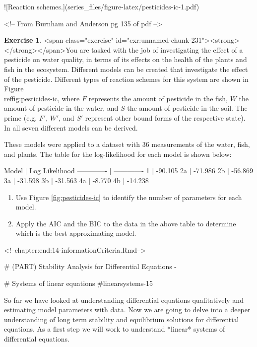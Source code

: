\documentclass[
]{book}
\theoremstyle{definition}
\theoremstyle{definition}
\theoremstyle{definition}
\newtheorem{exercise}{Exercise}[chapter]
\theoremstyle{remark}
\begin{document}
![\label{fig:pesticides-ic}Reaction schemes.](series_files/figure-latex/pesticides-ic-1.pdf) 



<!-- From Burnham and Anderson pg 135 of pdf -->
\begin{exercise}
<span class="exercise" id="exr:unnamed-chunk-231"><strong>\label{exr:unnamed-chunk-231} </strong></span>You are tasked with the job of investigating the effect of a pesticide on water quality, in terms of its effects on the health of the plants and fish in the ecosystem.  Different models can be created that investigate the effect of the pesticide.  Different types of reaction schemes for this system are shown in Figure \\ref{fig:pesticides-ic}, where $F$ represents the amount of pesticide in the fish, $W$ the amount of pesticide in the water, and $S$ the amount of pesticide in the soil.  The prime (e.g. $F'$, $W'$, and $S'$ represent other bound forms of the respective state).  In all seven different models can be derived.

These models were applied to a dataset with 36 measurements of the water, fish, and plants. The table for the log-likelihood for each model is shown below:

Model  | Log Likelihood 
------------- | ------------- 
1    | -90.105  
2a    | -71.986 
2b       | -56.869 
3a        | -31.598 
3b    | -31.563 
4a       | -8.770 
4b    | -14.238 



\begin{enumerate}[label=\alph*.]
\item Use Figure \ref{fig:pesticides-ic} to identify the number of parameters for each model.
\item Apply the AIC and the BIC to the data in the above table to determine which is the best approximating model.
\end{enumerate}
\end{exercise}



<!--chapter:end:14-informationCriteria.Rmd-->

# (PART) Stability Analysis for Differential Equations {-} 

# Systems of linear equations {#linearsystems-15}

So far we have looked at understanding differential equations qualitatively and estimating model parameters with data.  Now we are going to delve into a deeper understanding of long term stability and equilibrium solutions for differential equations.  As a first step we will work to understand *linear* systems of differential equations.
\end{document}
